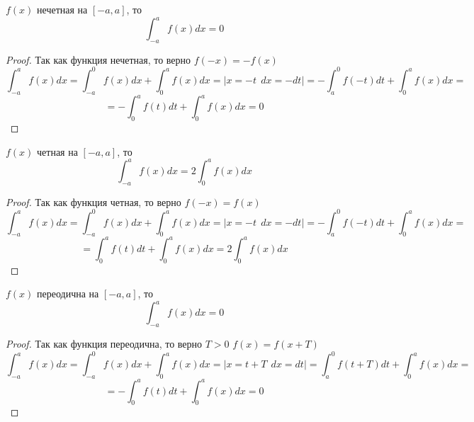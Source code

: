 \begin{theorem}
  $f(x)$ нечетная на $[-a, a]$, то
  \[\int^a_{-a} f(x)dx = 0\]
\end{theorem}

\begin{proof}
  Так как функция нечетная, то верно $f(-x) = -f(x)$
  \[\int^a_{-a} f(x)dx = \int^0_{-a} f(x)dx + \int^a_0 f(x)dx =
    |x = -t ~~ dx = -dt| = -\int^0_a f(-t)dt + \int^a_0 f(x)dx =\]
    \[= -\int^a_0 f(t)dt + \int^a_0 f(x)dx = 0\]
\end{proof}

\begin{theorem}
  $f(x)$ четная на $[-a, a]$, то
  \[\int^a_{-a} f(x)dx = 2\int^a_{0} f(x)dx \]
\end{theorem}

\begin{proof}
  Так как функция четная, то верно $f(-x) = f(x)$
  \[\int^a_{-a} f(x)dx = \int^0_{-a} f(x)dx + \int^a_0 f(x)dx =
    |x = -t ~~ dx = -dt| = -\int^0_a f(-t)dt + \int^a_0 f(x)dx =\]
    \[= \int^a_0 f(t)dt + \int^a_0 f(x)dx = 2\int^a_{0} f(x)dx\]
\end{proof}

\begin{theorem}
  $f(x)$ переодична на $[-a, a]$, то
  \[\int^a_{-a} f(x)dx = 0\]
\end{theorem}

\begin{proof}
  Так как функция переодична, то верно $T>0$ $f(x) = f(x+T)$
  \[\int^a_{-a} f(x)dx = \int^0_{-a} f(x)dx + \int^a_0 f(x)dx =
    |x = t+T ~~ dx = dt| = \int^0_a f(t+T)dt + \int^a_0 f(x)dx =\]
    \[= -\int^a_0 f(t)dt + \int^a_0 f(x)dx = 0\]
\end{proof}